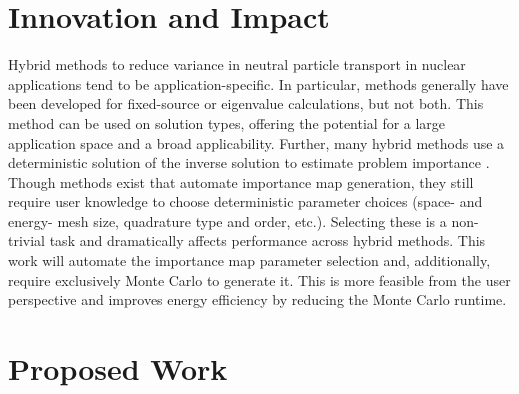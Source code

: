 \documentclass[letterpaper,12pt]{article}
\begin{document}
\section{Innovation and Impact}
Hybrid methods to reduce variance in neutral particle transport in nuclear
applications tend to be application-specific. In particular, methods generally
have been developed for fixed-source or eigenvalue calculations, but not both.
This method can be used on solution types, offering the potential for
a large application space and a broad applicability. Further, many hybrid
methods use a deterministic solution of the inverse solution to estimate problem
importance\cite{wagner_automated_1998, wagner_automated_2009,
haghighat_monte_2003, zhang_adjoint-based_2011, hoogenboom_optimum_1979} . Though methods exist that automate importance map
generation\cite{hendricks_mcnp_1985, burn_optimizing_2014,
  van_wijk_easy_2011, wagner_automated_1998, wagner_automated_2009,
haghighat_monte_2003, zhang_adjoint-based_2011, hoogenboom_optimum_1979},
they still require user knowledge to choose deterministic
parameter choices (space- and energy- mesh size, quadrature type and order,
etc.). Selecting these is a non-trivial task and dramatically affects performance
across hybrid methods. This work will automate the importance map parameter selection
and, additionally, require exclusively Monte Carlo to generate it. This is more
feasible from the user perspective and improves energy efficiency by reducing
the Monte Carlo runtime.


\section{Proposed Work}
\end{document}

